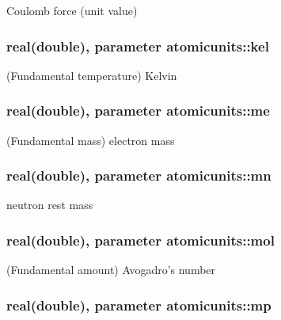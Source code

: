 Coulomb force (unit value) 

\hypertarget{classatomicunits_a0b4d6ac453558bc86022587236f7d076}{
\subsubsection[{kel}]{\setlength{\rightskip}{0pt plus 5cm}real(double), parameter atomicunits\-::kel}}\label{classatomicunits_a0b4d6ac453558bc86022587236f7d076}


(Fundamental temperature) Kelvin 

\hypertarget{classatomicunits_a02f36d49c4a56d1cc84c8cda6c631a68}{
\subsubsection[{me}]{\setlength{\rightskip}{0pt plus 5cm}real(double), parameter atomicunits\-::me}}\label{classatomicunits_a02f36d49c4a56d1cc84c8cda6c631a68}


(Fundamental mass) electron mass 

\hypertarget{classatomicunits_a001e0a01ab152644eb7df31ade44b290}{
\subsubsection[{mn}]{\setlength{\rightskip}{0pt plus 5cm}real(double), parameter atomicunits\-::mn}}\label{classatomicunits_a001e0a01ab152644eb7df31ade44b290}


neutron rest mass 

\hypertarget{classatomicunits_af00d60f8fc301784d6e48a53e524a4c8}{
\subsubsection[{mol}]{\setlength{\rightskip}{0pt plus 5cm}real(double), parameter atomicunits\-::mol}}\label{classatomicunits_af00d60f8fc301784d6e48a53e524a4c8}


(Fundamental amount) Avogadro's number 

\hypertarget{classatomicunits_a62f37608529c74a442a81baa515965d6}{
\subsubsection[{mp}]{\setlength{\rightskip}{0pt plus 5cm}real(double), parameter atomicunits\-::mp}}\label{classatomicunits_a62f37608529c74a442a81baa515965d6}


